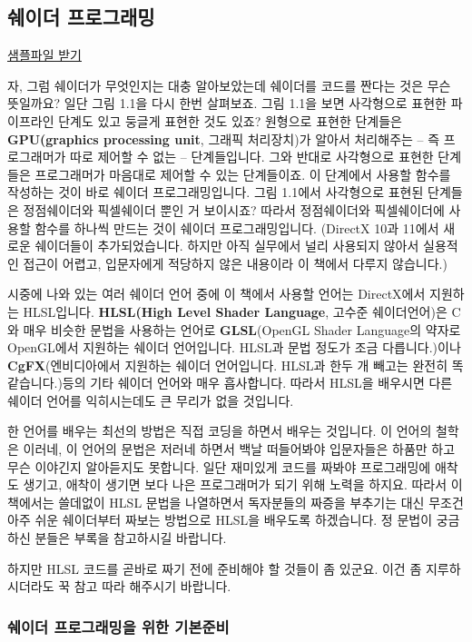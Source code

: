 
\subsection{쉐이더 프로그래밍}

\href{https://app.box.com/s/9409f61ba4f1a34254c6}{샘플파일 받기}

자, 그럼 쉐이더가 무엇인지는 대충 알아보았는데 쉐이더를 코드를 짠다는 것은 무슨 뜻일까요? 일단 그림 1.1을 다시 한번 살펴보죠. 그림 1.1을 보면 사각형으로 표현한 파이프라인 단계도 있고 둥글게 표현한 것도 있죠? 원형으로 표현한 단계들은 \textbf{GPU(graphics processing unit}, 그래픽 처리장치)가 알아서 처리해주는 -- 즉 프로그래머가 따로 제어할 수 없는 -- 단계들입니다. 그와 반대로 사각형으로 표현한 단계들은 프로그래머가 마음대로 제어할 수 있는 단계들이죠. 이 단계에서 사용할 함수를 작성하는 것이 바로 쉐이더 프로그래밍입니다. 그림 1.1에서 사각형으로 표현된 단계들은 정점쉐이더와 픽셀쉐이더 뿐인 거 보이시죠? 따라서 정점쉐이더와 픽셀쉐이더에 사용할 함수를 하나씩 만드는 것이 쉐이더 프로그래밍입니다. (DirectX 10과 11에서 새로운 쉐이더들이 추가되었습니다. 하지만 아직 실무에서 널리 사용되지 않아서 실용적인 접근이 어렵고, 입문자에게 적당하지 않은 내용이라 이 책에서 다루지 않습니다.)

시중에 나와 있는 여러 쉐이더 언어 중에 이 책에서 사용할 언어는 DirectX에서 지원하는 HLSL입니다. \textbf{HLSL(High Level Shader Language}, 고수준 쉐이더언어)은 C와 매우 비슷한 문법을 사용하는 언어로 \textbf{GLSL}(OpenGL Shader Language의 약자로 OpenGL에서 지원하는 쉐이더 언어입니다. HLSL과 문법 정도가 조금 다릅니다.)이나 \textbf{CgFX}(엔비디아에서 지원하는 쉐이더 언어입니다. HLSL과 한두 개 빼고는 완전히 똑같습니다.)등의 기타 쉐이더 언어와 매우 흡사합니다. 따라서 HLSL을 배우시면 다른 쉐이더 언어를 익히시는데도 큰 무리가 없을 것입니다.

한 언어를 배우는 최선의 방법은 직접 코딩을 하면서 배우는 것입니다. 이 언어의 철학은 이러네, 이 언어의 문법은 저러네 하면서 백날 떠들어봐야 입문자들은 하품만 하고 무슨 이야긴지 알아듣지도 못합니다. 일단 재미있게 코드를 짜봐야 프로그래밍에 애착도 생기고, 애착이 생기면 보다 나은 프로그래머가 되기 위해 노력을 하지요. 따라서 이 책에서는 쓸데없이 HLSL 문법을 나열하면서 독자분들의 짜증을 부추기는 대신 무조건 아주 쉬운 쉐이더부터 짜보는 방법으로 HLSL을 배우도록 하겠습니다. 정 문법이 궁금하신 분들은 부록을 참고하시길 바랍니다.

하지만 HLSL 코드를 곧바로 짜기 전에 준비해야 할 것들이 좀 있군요. 이건 좀 지루하시더라도 꾹 참고 따라 해주시기 바랍니다.

\subsubsection{쉐이더 프로그래밍을 위한 기본준비}

